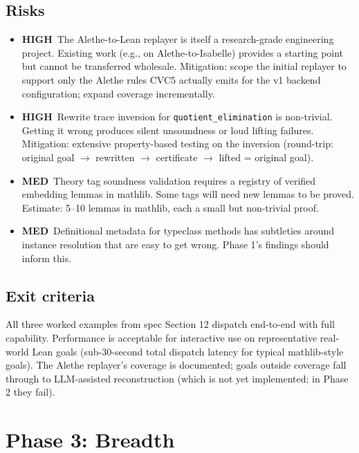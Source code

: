 \documentclass[11pt,letterpaper]{article}
\newcommand{\highrisk}{\textcolor{riskhigh}{\textbf{HIGH}}}
\newcommand{\medrisk}{\textcolor{riskmed}{\textbf{MED}}}
\begin{document}
\subsection{Risks}

\begin{itemize}
  \item \highrisk\ The Alethe-to-Lean replayer is itself a research-grade
        engineering project. Existing work (e.g., on Alethe-to-Isabelle)
        provides a starting point but cannot be transferred wholesale.
        Mitigation: scope the initial replayer to support only the
        Alethe rules CVC5 actually emits for the v1 backend
        configuration; expand coverage incrementally.
  \item \highrisk\ Rewrite trace inversion for \texttt{quotient\_elimination}
        is non-trivial. Getting it wrong produces silent unsoundness or
        loud lifting failures. Mitigation: extensive property-based
        testing on the inversion (round-trip: original goal $\to$
        rewritten $\to$ certificate $\to$ lifted = original goal).
  \item \medrisk\ Theory tag soundness validation requires a registry of
        verified embedding lemmas in mathlib. Some tags will need new
        lemmas to be proved. Estimate: 5--10 lemmas in mathlib, each a
        small but non-trivial proof.
  \item \medrisk\ Definitional metadata for typeclass methods has
        subtleties around instance resolution that are easy to get
        wrong. Phase 1's findings should inform this.
\end{itemize}

\subsection{Exit criteria}

All three worked examples from spec Section 12 dispatch end-to-end with
full capability. Performance is acceptable for interactive use on
representative real-world Lean goals (sub-30-second total dispatch
latency for typical mathlib-style goals). The Alethe replayer's coverage
is documented; goals outside coverage fall through to LLM-assisted
reconstruction (which is not yet implemented; in Phase 2 they fail).

\section{Phase 3: Breadth}
\label{sec:phase3}
\end{document}

